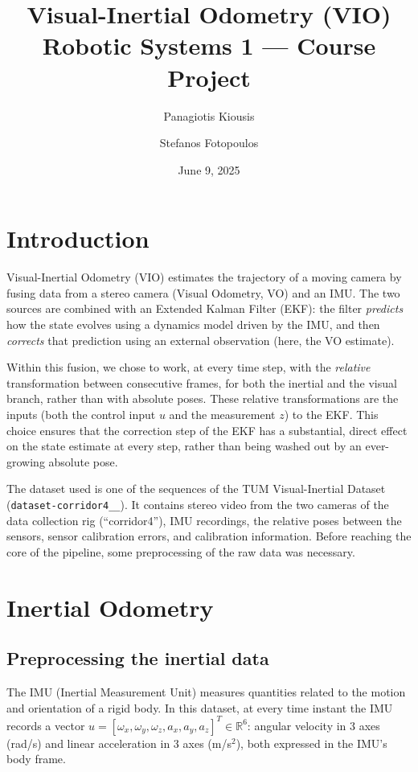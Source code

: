 \documentclass[11pt]{article}
\title{\Large Visual-Inertial Odometry (VIO)\\[2pt]\large Robotic Systems 1 --- Course Project}
\author{Panagiotis Kiousis \and Stefanos Fotopoulos}
\date{June 9, 2025}
\begin{document}
\maketitle

\section*{Introduction}
Visual-Inertial Odometry (VIO) estimates the trajectory of a moving camera by fusing data from a
stereo camera (Visual Odometry, VO) and an IMU. The two sources are combined with an Extended Kalman
Filter (EKF): the filter \emph{predicts} how the state evolves using a dynamics model driven by the
IMU, and then \emph{corrects} that prediction using an external observation (here, the VO estimate).

Within this fusion, we chose to work, at every time step, with the \emph{relative} transformation
between consecutive frames, for both the inertial and the visual branch, rather than with absolute
poses. These relative transformations are the inputs (both the control input $u$ and the measurement
$z$) to the EKF. This choice ensures that the correction step of the EKF has a substantial, direct
effect on the state estimate at every step, rather than being washed out by an ever-growing absolute
pose.

\begin{sloppypar}
The dataset used is one of the sequences of the TUM Visual-Inertial Dataset
(\texttt{dataset-corridor4\_\_}). It contains stereo video from the two cameras of the data
collection rig (``corridor4''), IMU recordings, the relative poses between the sensors, sensor
calibration errors, and calibration information. Before reaching the core of the pipeline, some
preprocessing of the raw data was necessary.
\end{sloppypar}

\section{Inertial Odometry}

\subsection{Preprocessing the inertial data}
The IMU (Inertial Measurement Unit) measures quantities related to the motion and orientation of a
rigid body. In this dataset, at every time instant the IMU records a vector
$u = [\omega_x,\omega_y,\omega_z,a_x,a_y,a_z]^T \in \mathbb{R}^6$: angular velocity in 3 axes (rad/s)
and linear acceleration in 3 axes (m/s$^2$), both expressed in the IMU's body frame.
\end{document}
